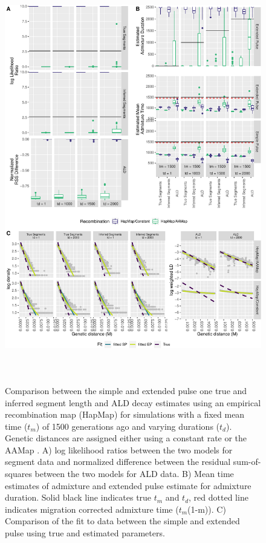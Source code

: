 \documentclass[11pt]{article}
\begin{document}
\begin{figure}
\centering
\includegraphics[width=16cm,height=18cm,keepaspectratio]{ATE_Revisions_files/figure-latex/figResult2_all_together_Supplements-1.pdf}
\caption{\label{fig:figResult2_sup} Comparison between the simple and extended pulse one true and inferred segment length and ALD decay estimates using an empirical recombination map (HapMap) for simulations with a fixed mean time ($t_m$) of 1500 generations ago and varying durations ($t_d$). Genetic distances are assigned either using a constant rate or the AAMap . A) log likelihood ratios between the two models for segment data and normalized difference between the residual sum-of-squares between the two models for ALD data. B) Mean time estimates of admixture and extended pulse estimate for admixture duration. Solid black line indicates true $t_m$ and $t_d$, red dotted line indicates migration corrected admixture time ($t_m$(1-m)). C) Comparison of the fit to data between the simple and extended pulse using true and estimated parameters. }
\end{figure}
\end{document}
